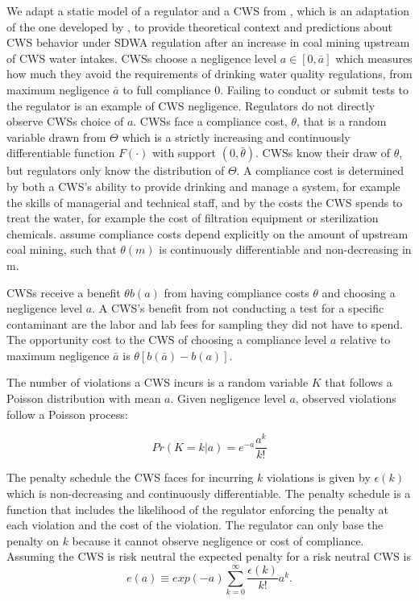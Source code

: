 \documentclass{article}
\begin{document}
We adapt a static model of a regulator and a CWS from \cite{kang2021understanding}, which is an adaptation of the one developed by \cite{mookherjee1994marginal}, to provide theoretical context and predictions about CWS behavior under SDWA regulation after an increase in coal mining upstream of CWS water intakes. CWSs choose a negligence level $a \in [0,\bar{a}]$ which measures how much they avoid the requirements of drinking water quality regulations, from maximum negligence $\bar{a}$ to full compliance 0. Failing to conduct or submit tests to the regulator is an example of CWS negligence. Regulators do not directly observe CWSs choice of $a$. CWSs face a compliance cost, $\theta$, that is a random variable drawn from $\Theta$ which is a strictly increasing and continuously differentiable function $F(\cdot)$ with support $(0,\bar{\theta})$. CWSs know their draw of $\theta$, but regulators only know the distribution of $\Theta$. A compliance cost is determined by both a CWS's ability to provide drinking and manage a system, for example the skills of managerial and technical staff, and by the costs the CWS spends to treat the water, for example the cost of filtration equipment or sterilization chemicals. assume compliance costs depend explicitly on the amount of upstream coal mining, such that $\theta (m)$ is continuously differentiable and non-decreasing in m.

CWSs receive a benefit $\theta b(a)$ from having compliance costs $\theta$ and choosing a negligence level $a$. A CWS's benefit from not conducting a test for a specific contaminant are the labor and lab fees for sampling they did not have to spend. The opportunity cost to the CWS of choosing a compliance level $a$ relative to maximum negligence $\bar{a}$ is $\theta [b(\bar{a})-b(a)]$.

The number of violations a CWS incurs is a random variable $K$ that follows a Poisson distribution with mean $a$. Given negligence level $a$, observed violations follow a Poisson process:

\[Pr(K = k | a) = e^{-a}  \frac{a^k}{k!}\]

The penalty schedule the CWS faces for incurring $k$ violations is given by $\epsilon(k)$ which is non-decreasing and continuously differentiable. The penalty schedule is a function that includes the likelihood of the regulator enforcing the penalty at each violation and the cost of the violation. The regulator can only base the penalty on $k$ because it cannot observe negligence or cost of compliance. Assuming the CWS is risk neutral the expected penalty for a risk neutral CWS is 
\begin{equation}
    e(a)\equiv exp(-a)\sum^\infty_{k=0}\frac{\epsilon(k)}{k!}a^k.
\end{equation}
\end{document}
